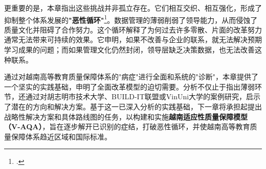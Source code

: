 更重要的是，本章指出这些挑战并非孤立存在。它们相互交织、相互强化，形成了抑制整个体系发展的\textbf{"恶性循环"}\footcite{aunsec_redesigningIQA_2022}。数据管理的薄弱削弱了领导能力，从而侵蚀了质量文化并阻碍了合作努力。这个循环解释了为何过去许多零散、片面的改革努力通常无法带来可持续的效果。它申明，如果不改善与企业的联系，就无法解决预期学习成果的问题；而如果管理文化仍然封闭，领导层缺乏决策数据，也无法改善这种联系。

通过对越南高等教育质量保障体系的"病症"进行全面和系统的"诊断"，本章提供了一个坚实的实践基础，申明了全面改革模型的迫切需要。分析不仅止于指出薄弱环节，还通过对胡志明市技术大学、BUILD-IT联盟或VinUni大学的案例研究，启示了潜在的方向和解决方案。基于这一已深入分析的实践基础，下一章将承担起提出战略性解决方案和具体路线图的任务，以构建和实施\textbf{越南适应性质量保障模型（V-AQA）}，旨在逐步解开已识别的症结，打破恶性循环，并使越南高等教育质量保障体系趋近区域和国际标准。






















